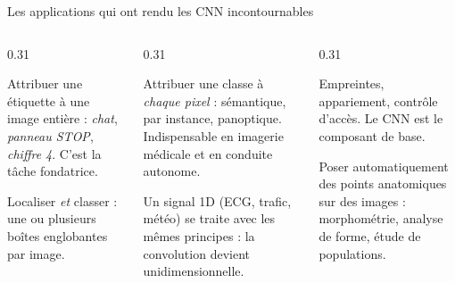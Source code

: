 \begin{frame}{Les applications qui ont rendu les CNN incontournables}
\begin{columns}[t]
\begin{column}{0.31\textwidth}
\begin{ebox}
Attribuer une étiquette à une image entière : \emph{chat}, \emph{panneau STOP},
\emph{chiffre 4}. C'est la tâche fondatrice.
\end{ebox}
\begin{ebox}
Localiser \emph{et} classer : une ou plusieurs boîtes englobantes par image.
\end{ebox}
\end{column}
\begin{column}{0.31\textwidth}
\begin{ebox}[Segmentation]
Attribuer une classe à \emph{chaque pixel} : sémantique, par instance, panoptique.
Indispensable en imagerie médicale et en conduite autonome.
\end{ebox}
\begin{ebox}
Un signal 1D (ECG, trafic, météo) se traite avec les mêmes principes : la
convolution devient unidimensionnelle.
\end{ebox}
\end{column}
\begin{column}{0.31\textwidth}
\begin{ebox}
Empreintes, appariement, contrôle d'accès. Le CNN est le composant de base.
\end{ebox}
\begin{ebox}[Landmarking]
Poser automatiquement des points anatomiques sur des images : morphométrie,
analyse de forme, étude de populations.
\end{ebox}
\end{column}
\end{columns}
\end{frame}

